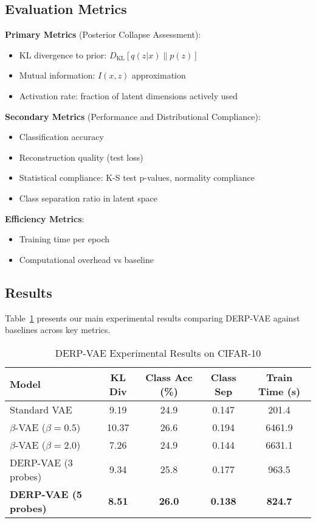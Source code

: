 \documentclass{article}
\begin{document}
\subsection{Evaluation Metrics}

\textbf{Primary Metrics} (Posterior Collapse Assessment):
\begin{itemize}
\item KL divergence to prior: $D_{\text{KL}}[q(z|x) \| p(z)]$
\item Mutual information: $I(x,z)$ approximation
\item Activation rate: fraction of latent dimensions actively used
\end{itemize}

\textbf{Secondary Metrics} (Performance and Distributional Compliance):
\begin{itemize}
\item Classification accuracy
\item Reconstruction quality (test loss)
\item Statistical compliance: K-S test p-values, normality compliance
\item Class separation ratio in latent space
\end{itemize}

\textbf{Efficiency Metrics}:
\begin{itemize}
\item Training time per epoch
\item Computational overhead vs baseline
\end{itemize}

\subsection{Results}

Table~\ref{tab:main_results} presents our main experimental results comparing DERP-VAE against baselines across key metrics.

\begin{table}[t]
\caption{DERP-VAE Experimental Results on CIFAR-10}
\label{tab:main_results}
\centering
\begin{tabular}{lcccc}
\toprule
\textbf{Model} & \textbf{KL Div} & \textbf{Class Acc (\%)} & \textbf{Class Sep} & \textbf{Train Time (s)} \\
\midrule
Standard VAE & 9.19 & 24.9 & 0.147 & 201.4 \\
$\beta$-VAE ($\beta=0.5$) & 10.37 & 26.6 & 0.194 & 6461.9 \\
$\beta$-VAE ($\beta=2.0$) & 7.26 & 24.9 & 0.144 & 6631.1 \\
DERP-VAE (3 probes) & 9.34 & 25.8 & 0.177 & 963.5 \\
\textbf{DERP-VAE (5 probes)} & \textbf{8.51} & \textbf{26.0} & \textbf{0.138} & \textbf{824.7} \\
\bottomrule
\end{tabular}
\end{table}
\end{document}
